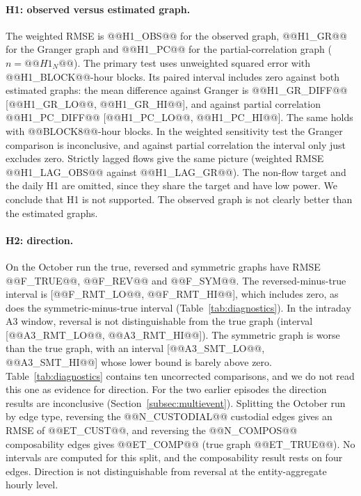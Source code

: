 \documentclass[referee,pdflatex,sn-mathphys-ay]{sn-jnl}
\theoremstyle{thmstyleone}%
\theoremstyle{thmstyletwo}%
\theoremstyle{thmstylethree}%
\begin{document}
\paragraph{H1: observed versus estimated graph.} The weighted RMSE is @@H1_OBS@@ for the observed graph, @@H1_GR@@ for the
Granger graph and @@H1_PC@@ for the partial-correlation graph ($n=@@H1_N@@$). The primary test uses unweighted squared error with
@@H1_BLOCK@@-hour blocks. Its paired interval includes zero against both estimated graphs: the mean difference against Granger is
@@H1_GR_DIFF@@ [@@H1_GR_LO@@, @@H1_GR_HI@@], and against partial correlation @@H1_PC_DIFF@@ [@@H1_PC_LO@@, @@H1_PC_HI@@]. The
same holds with @@BLOCK8@@-hour blocks. In the weighted sensitivity test the Granger comparison is inconclusive, and against
partial correlation the interval only just excludes zero. Strictly lagged flows give the same picture
(weighted RMSE @@H1_LAG_OBS@@ against @@H1_LAG_GR@@). The non-flow target and the daily H1 are omitted, since they share the
target and have low power. We conclude that H1 is not supported. The observed graph is not clearly better than the
estimated graphs.

\paragraph{H2: direction.} On the October run the true, reversed and symmetric graphs have RMSE @@F_TRUE@@, @@F_REV@@ and
@@F_SYM@@. The reversed-minus-true interval is [@@F_RMT_LO@@, @@F_RMT_HI@@], which includes zero, as does the symmetric-minus-true
interval (Table~\ref{tab:diagnostics}). In the intraday A3 window, reversal is not distinguishable from the true graph
(interval [@@A3_RMT_LO@@, @@A3_RMT_HI@@]). The symmetric graph is worse than the true graph, with an interval [@@A3_SMT_LO@@, @@A3_SMT_HI@@]
whose lower bound is barely above zero. Table~\ref{tab:diagnostics} contains ten uncorrected comparisons, and we do not read this one as evidence for
direction. For the two earlier episodes the direction results are inconclusive (Section~\ref{subsec:multievent}).
Splitting the October run by edge type, reversing the @@N_CUSTODIAL@@ custodial edges gives an RMSE of @@ET_CUST@@, and reversing the
@@N_COMPOS@@ composability edges gives @@ET_COMP@@ (true graph @@ET_TRUE@@). No intervals are computed for this split, and the
composability result rests on four edges. Direction is not distinguishable from reversal at the entity-aggregate hourly level.
\end{document}
